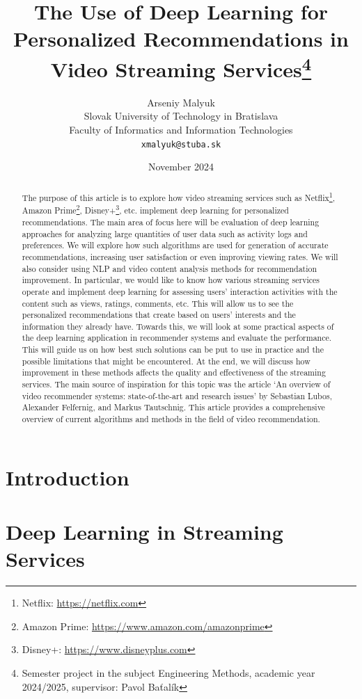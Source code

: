 \documentclass[12pt,english,a4paper]{article}
\title{The Use of Deep Learning for Personalized Recommendations in Video Streaming Services\thanks{Semester project in the subject Engineering Methods, academic year 2024/2025, supervisor: Pavol Baťalík}}
\author{Arseniy Malyuk\\[2pt]
	{\small Slovak University of Technology in Bratislava}\\
	{\small Faculty of Informatics and Information Technologies}\\
	{\small \texttt{xmalyuk@stuba.sk}}
	}
\date{\small November 2024}
\begin{document}
\maketitle

\begin{abstract}
    The purpose of this article is to explore how video streaming services such as Netflix\footnote{Netflix: \url{https://netflix.com}}, Amazon Prime\footnote{Amazon Prime: \url{https://www.amazon.com/amazonprime}}, Disney+\footnote{Disney+: \url{https://www.disneyplus.com}}, etc. implement deep learning for personalized recommendations. The main area of focus here will be evaluation of deep learning approaches for analyzing large quantities of user data such as activity logs and preferences. We will explore how such algorithms are used for generation of accurate recommendations, increasing user satisfaction or even improving viewing rates. We will also consider using NLP and video content analysis methods for recommendation improvement. In particular, we would like to know how various streaming services operate and implement deep learning for assessing users’ interaction activities with the content such as views, ratings, comments, etc. This will allow us to see the personalized recommendations that create based on users’ interests and the information they already have. Towards this, we will look at some practical aspects of the deep learning application in recommender systems and evaluate the performance. This will guide us on how best such solutions can be put to use in practice and the possible limitations that might be encountered. At the end, we will discuss how improvement in these methods affects the quality and effectiveness of the streaming services. The main source of inspiration for this topic was the article ‘An overview of video recommender systems: state-of-the-art and research issues’\cite{SAM-Overview} by Sebastian Lubos, Alexander Felfernig, and Markus Tautschnig. This article provides a comprehensive overview of current algorithms and methods in the field of video recommendation.
\end{abstract}

\section{Introduction}

\section{Deep Learning in Streaming Services}
\end{document}
